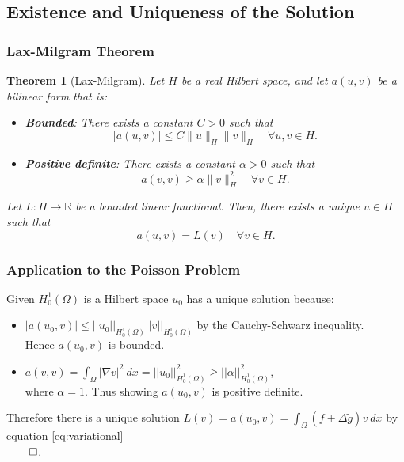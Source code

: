 \documentclass{report}
\newtheorem{theorem}{Theorem}
\begin{document}
\subsection{Existence and Uniqueness of the Solution}

\subsubsection{Lax-Milgram Theorem}
\begin{theorem}[Lax-Milgram]
    Let $H$ be a real Hilbert space, and let $a(u,v)$  be a bilinear form that is:
    \begin{itemize}
        \item \textbf{Bounded}: There exists a constant $C > 0$ such that
        $$
        |a(u, v)| \leq C \|u\|_H \|v\|_H \quad \forall u, v \in H.
        $$
        \item \textbf{Positive definite}: There exists a constant $\alpha > 0$ such that
        $$
        a(v, v) \geq \alpha \|v\|_H^2 \quad \forall v \in H.
        $$
    \end{itemize}
    Let $L: H \rightarrow \mathbb{R}$ be a bounded linear functional. Then, there exists a unique $u \in H$ such that
    $$
    a(u, v) = L(v) \quad \forall v \in H.
    $$ \cite{LaxMilgram1955}

\end{theorem} 

\subsubsection{Application to the Poisson Problem}
Given $H^1_0(\Omega)$ is a Hilbert space $u_0$ has a unique solution because:
\begin{itemize}
    \item $|a(u_0,v)| \leq ||u_0||_{H^1_0(\Omega)} ||v||_{H^1_0(\Omega)} $ by the Cauchy-Schwarz inequality.\\
    Hence $a(u_0,v)$ is bounded.

    \item $a(v,v) = \int_{\Omega}|\nabla v|^2\ dx = ||u_0||^2_{H_0^1(\Omega)} \geq ||\alpha||^2_{H_0^1(\Omega)}$,\\
    where $\alpha = 1.$ Thus showing $a(u_0,v)$ is positive definite.
\end{itemize}

Therefore there is a unique solution $L(v) = a(u_0,v) = \int_\Omega (f + \Delta\tilde{g})v\ dx$ by equation \eqref{eq:variational}\\
$\qed$.
\end{document}
